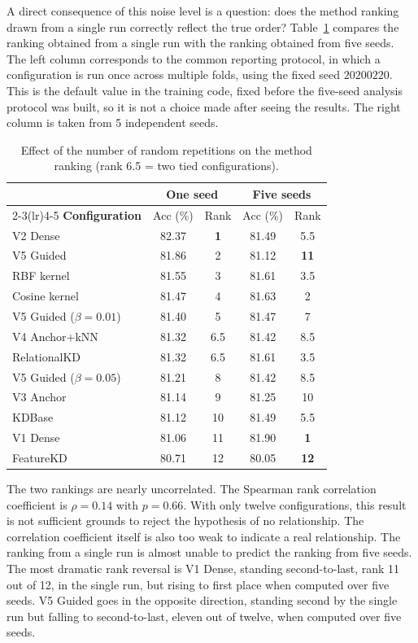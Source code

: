 A direct consequence of this noise level is a question: does the
method ranking drawn from a single run correctly reflect the true
order? Table~\ref{tab:daohang} compares the ranking obtained from a
single run with the ranking obtained from five seeds. The left
column corresponds to the common reporting protocol, in which a
configuration is run once across multiple folds, using the fixed
seed $20200220$. This is the default value in the training code,
fixed before the five-seed analysis protocol was built, so it is
not a choice made after seeing the results. The right column is
taken from 5 independent seeds.

\begin{table}[!htbp]
\centering
\caption{Effect of the number of random repetitions on the method
ranking (rank 6.5 = two tied configurations).}
\label{tab:daohang}
\begin{tabular}{lcccc}
\toprule
& \multicolumn{2}{c}{\textbf{One seed}} & \multicolumn{2}{c}{\textbf{Five seeds}} \\
\cmidrule(lr){2-3}\cmidrule(lr){4-5}
\textbf{Configuration} & Acc (\%) & Rank & Acc (\%) & Rank \\
\midrule
V2 Dense & 82.37 & \textbf{1} & 81.49 & 5.5 \\
V5 Guided & 81.86 & 2 & 81.12 & \textbf{11} \\
RBF kernel & 81.55 & 3 & 81.61 & 3.5 \\
Cosine kernel & 81.47 & 4 & 81.63 & 2 \\
V5 Guided ($\beta = 0.01$) & 81.40 & 5 & 81.47 & 7 \\
V4 Anchor+kNN & 81.32 & 6.5 & 81.42 & 8.5 \\
RelationalKD & 81.32 & 6.5 & 81.61 & 3.5 \\
V5 Guided ($\beta = 0.05$) & 81.21 & 8 & 81.42 & 8.5 \\
V3 Anchor & 81.14 & 9 & 81.25 & 10 \\
KDBase & 81.12 & 10 & 81.49 & 5.5 \\
V1 Dense & 81.06 & 11 & 81.90 & \textbf{1} \\
FeatureKD & 80.71 & 12 & 80.05 & \textbf{12} \\
\bottomrule
\end{tabular}
\end{table}
\FloatBarrier

The two rankings are nearly uncorrelated. The Spearman rank
correlation coefficient is $\rho = 0.14$ with $p = 0.66$. With only
twelve configurations, this result is not sufficient grounds to
reject the hypothesis of no relationship. The correlation
coefficient itself is also too weak to indicate a real relationship.
The ranking from a single run is almost unable to predict the
ranking from five seeds. The most dramatic rank reversal is V1
Dense, standing second-to-last, rank 11 out of 12, in the single
run, but rising to first place when computed over five seeds. V5
Guided goes in the opposite direction, standing second by the single
run but falling to second-to-last, eleven out of twelve, when
computed over five seeds.

